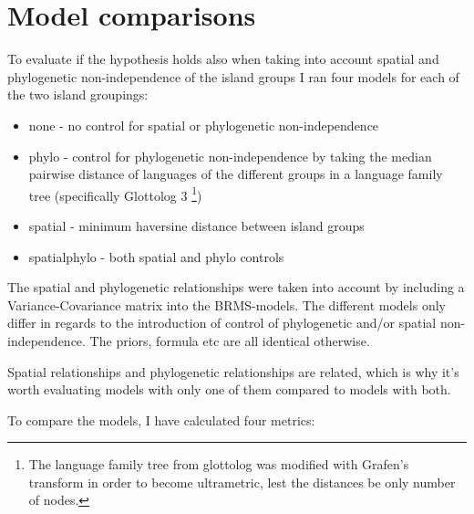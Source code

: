 \documentclass[12pt,letterpaper]{article}
\begin{document}
\begin{landscape}

\end{landscape}

\begin{landscape}

\end{landscape}

\newpage

\section{Model comparisons}
\label{appendix_model_fit_scores}
To evaluate if the hypothesis holds also when taking into account spatial and phylogenetic non-independence of the island groups I ran four models for each of the two island groupings:

\begin{itemize}

    \item none - no control for spatial or phylogenetic non-independence
    \item phylo - control for phylogenetic non-independence by taking the median pairwise distance of languages of the different groups in a language family tree (specifically Glottolog 3 \citet{glottolog3}\footnote{The language family tree from glottolog was modified with Grafen's transform in order to become ultrametric, lest the distances be only number of nodes.})
    \item spatial - minimum haversine distance between island groups
    \item spatialphylo - both spatial and phylo controls
    
\end{itemize}

The spatial and phylogenetic relationships were taken into account by including a Variance-Covariance matrix into the BRMS-models. The different models only differ in regards to the introduction of control of phylogenetic and/or spatial non-independence. The priors, formula etc are all identical otherwise.

Spatial relationships and phylogenetic relationships are related, which is why it's worth evaluating models with only one of them compared to models with both.

To compare the models, I have calculated four metrics:
\end{document}
